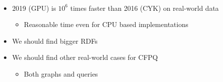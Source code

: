 \documentclass[a0paper,portrait]{baposter}
\begin{document}
\begin{poster}
{\begin{minipage}[t]{0.5\textwidth}
\end{minipage}
~
\begin{minipage}[t]{0.48\textwidth}
  \begin{itemize}
    \item 2019 (GPU) is $10^6$ times faster than 2016 (CYK) on real-world data
    \begin{itemize}
       \item Reasonable time even for CPU based implementations
    \end{itemize}
    \item We should find bigger RDFs
    \item We should find other real-world cases for CFPQ
    \begin{itemize}
       \item Both graphs and queries
    \end{itemize}

  \end{itemize}
\end{minipage}
}

\setlength{\tabcolsep}{5pt}
\end{poster}
\end{document}
